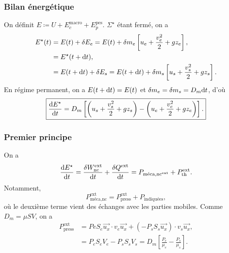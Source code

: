         \subsubsection{Bilan énergétique}

            On définit $E\coloneqq U+E_c^{\text{macro}}+E_p^{\text{pes}}$. $\Sigma^{\star}$ étant fermé, on a 
            \begin{align*}
                E^{\star}(t)
                &=E(t)+\delta E_e=E(t)+\delta m_e\left[u_e+\frac{v_e^{2}}{2}+gz_e\right],\\
                &=E^{\star}(t+\mathrm{d} t),\\
                &= E(t+\mathrm{d} t)+\delta E_s=E(t+\mathrm{d} t)+\delta m_s\left[u_s+\frac{v_s^{2}}{2}+g z_s\right].
            \end{align*}
            En régime permanent, on a $E(t+\mathrm{d} t)=E(t)$ et $\delta m_e=\delta m_s=D_m\mathrm{d} t$, d'où
            \begin{equation*}
                \boxed{
                    \frac{\mathrm{d} E^{\star}}{\mathrm{d} t}=D_m\left[\left(u_s+\frac{v_s^{2}}{2}+g z_s\right)-\left(u_e+\frac{v_e^{2}}{2}+g z_e\right)\right].
                }
            \end{equation*}

        \subsubsection{Premier principe}

            On a 
            \begin{equation*}
                \frac{\mathrm{d} E^{\star}}{\mathrm{d} t}=\frac{\delta W_{\text{nc}}^{\text{ext}}}{\mathrm{d} t}+\frac{\delta Q^{\text{ext}}}{\mathrm{d} t}=P_{\text{méca,nc}^{\text{ext}}}+P_{\text{th}}^{\text{ext}}.
            \end{equation*}
            Notamment, 
            \begin{equation*}
                P_{\text{méca,nc}}^{\text{ext}}=P_{\text{press}}^{\text{ext}}+P_{\text{indiquées}},
            \end{equation*}
            où le deuxième terme vient des échanges avec les parties mobiles. Comme $D_m=\mu SV$, on a 
            \begin{align*}
                P_{\text{press}}^{\text{ext}}
                &=Pe S_e\vec{u_x}\cdot v_e\vec{u_x}+(-P_s S_s\vec{u_x})\cdot v_s\vec{u_x},\\
                &=P_e S_e V_e-P_s S_s V_s = D_m\left[\frac{P_e}{\mu_e}-\frac{P_s}{\mu_s}\right].
            \end{align*}

